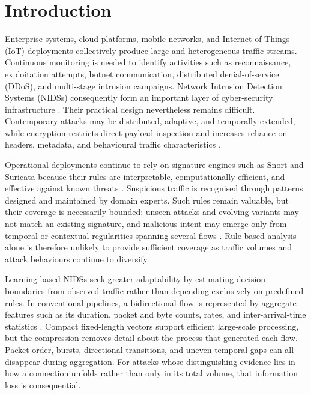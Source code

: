 \documentclass[11pt,fleqn]{report}
\begin{document}

\chapter{Introduction}
\label{sec:introduction}

Enterprise systems, cloud platforms, mobile networks, and Internet-of-Things (IoT) deployments collectively produce large and heterogeneous traffic streams. Continuous monitoring is needed to identify activities such as reconnaissance, exploitation attempts, botnet communication, distributed denial-of-service (DDoS), and multi-stage intrusion campaigns. Network Intrusion Detection Systems (NIDSs) consequently form an important layer of cyber-security infrastructure \cite{Roesch1999,SommerPaxson2010}. Their practical design nevertheless remains difficult. Contemporary attacks may be distributed, adaptive, and temporally extended, while encryption restricts direct payload inspection and increases reliance on headers, metadata, and behavioural traffic characteristics \cite{Sharma2025EncryptedSurvey,Dong2025EncryptedPretrain}.

Operational deployments continue to rely on signature engines such as Snort and Suricata because their rules are interpretable, computationally efficient, and effective against known threats \cite{Roesch1999,SuricataGuide2026}. Suspicious traffic is recognised through patterns designed and maintained by domain experts. Such rules remain valuable, but their coverage is necessarily bounded: unseen attacks and evolving variants may not match an existing signature, and malicious intent may emerge only from temporal or contextual regularities spanning several flows \cite{SommerPaxson2010,Hozouri2025Survey}. Rule-based analysis alone is therefore unlikely to provide sufficient coverage as traffic volumes and attack behaviours continue to diversify.

Learning-based NIDSs seek greater adaptability by estimating decision boundaries from observed traffic rather than depending exclusively on predefined rules. In conventional pipelines, a bidirectional flow is represented by aggregate features such as its duration, packet and byte counts, rates, and inter-arrival-time statistics \cite{BuczakGuven2016,Ahmed2016Survey}. Compact fixed-length vectors support efficient large-scale processing, but the compression removes detail about the process that generated each flow. Packet order, bursts, directional transitions, and uneven temporal gaps can all disappear during aggregation. For attacks whose distinguishing evidence lies in how a connection unfolds rather than only in its total volume, that information loss is consequential.
\end{document}
